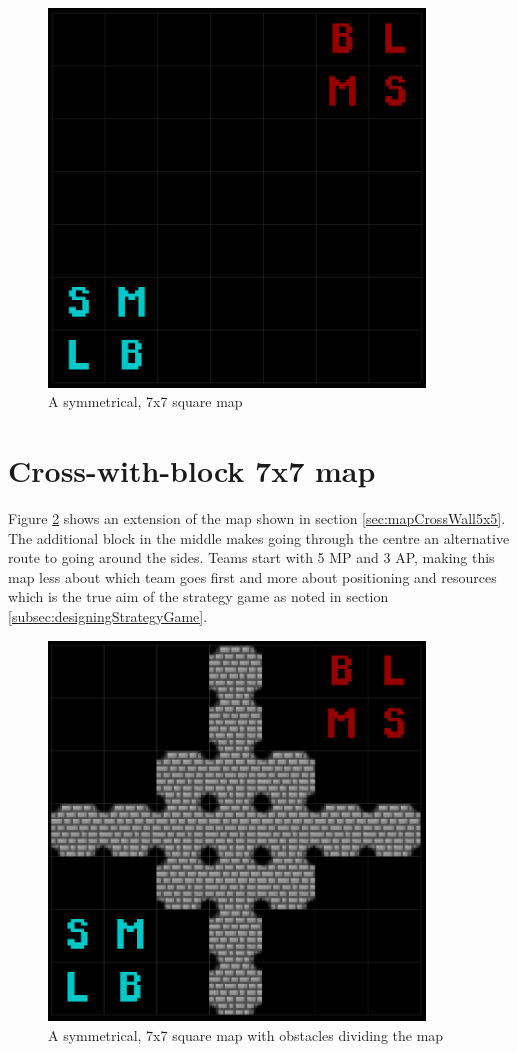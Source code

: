 \documentclass[11pt, a4paper]{report}
\begin{document}
\begin{appendices}
\begin{figure}[!h]
  \centering
  \includegraphics[width=10cm]{img/map_default_7x7.png}
  \caption{A symmetrical, 7x7 square map}
  \label{fig:mapDefault7x7}
\end{figure}

\section{Cross-with-block 7x7 map}
\label{sec:mapCrossWithBlock7x7}

Figure \ref{fig:mapCrossWithBlock7x7} shows an extension of the map shown in section \ref{sec:mapCrossWall5x5}. The additional block in the middle makes going through the centre an alternative route to going around the sides. Teams start with 5 MP and 3 AP, making this map less about which team goes first and more about positioning and resources which is the true aim of the strategy game as noted in section \ref{subsec:designingStrategyGame}.

\begin{figure}[!h]
  \centering
  \includegraphics[width=10cm]{img/map_cross_with_block_7x7.png}
  \caption{A symmetrical, 7x7 square map with obstacles dividing the map}
  \label{fig:mapCrossWithBlock7x7}
\end{figure}


\end{appendices}
\end{document}
